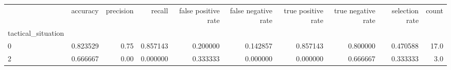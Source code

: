 \begin{tabular}{lrrrrrrrrr}
\toprule
{} &  accuracy &  precision &    recall &  false positive rate &  false negative rate &  true positive rate &  true negative rate &  selection rate &  count \\
tactical\_situation &           &            &           &                      &                      &                     &                     &                 &        \\
\midrule
0                  &  0.823529 &       0.75 &  0.857143 &             0.200000 &             0.142857 &            0.857143 &            0.800000 &        0.470588 &   17.0 \\
2                  &  0.666667 &       0.00 &  0.000000 &             0.333333 &             0.000000 &            0.000000 &            0.666667 &        0.333333 &    3.0 \\
\bottomrule
\end{tabular}
